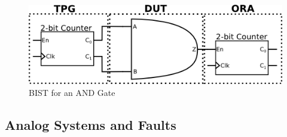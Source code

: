 \documentclass[12pt]{report}
\begin{document}
\begin{figure}
	\begin{center}
		\includegraphics[scale=1]{images/and-bist}
	\end{center}
	\caption{BIST for an AND Gate}
	\label{fig:andbist}
\end{figure}

\subsection{Analog Systems and Faults}
\label{sct:AnalogFaults}
\end{document}
